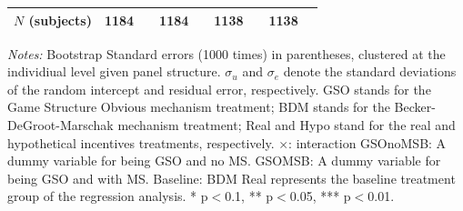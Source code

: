 \documentclass[12pt]{article}
\begin{document}
\begin{table}[H]
{\begin{tabular}{l*{4}{cc}}
\(N \) (subjects)      &        1184         &            &        1184         &            &        1138         &            &        1138         &            \\
\hline \hline
\end{tabular}
}




\begin{tablenotes}
          \footnotesize
           \item \textit{Notes:} Bootstrap Standard errors (1000 times) in parentheses, clustered at the individiual level given panel structure.  $\sigma_u$ and $\sigma_e$ denote the standard deviations of the random intercept and residual error, respectively. GSO stands for the Game Structure Obvious mechanism treatment; BDM stands for the Becker-DeGroot-Marschak mechanism treatment; Real and Hypo stand for the real and hypothetical incentives treatments, respectively. $\times$: interaction GSOnoMSB: A dummy variable for being GSO and no MS. GSOMSB: A dummy variable for being GSO and with MS.
             Baseline: BDM Real represents the baseline treatment group of the regression analysis. * p$<$0.1, ** p$<$0.05, *** p$<$0.01.
        \end{tablenotes}
            \end{table}

\clearpage
\end{document}
